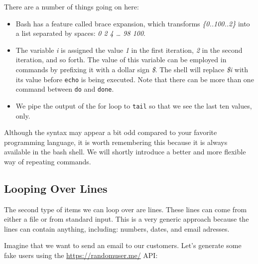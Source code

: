 \documentclass[
]{book}
\newenvironment{Shaded}{\begin{snugshade}}{\end{snugshade}}
\newcommand{\ExtensionTok}[1]{#1}
\newcommand{\FunctionTok}[1]{\textcolor[rgb]{0.00,0.00,0.00}{#1}}
\newcommand{\NormalTok}[1]{#1}
\newcommand{\OperatorTok}[1]{\textcolor[rgb]{0.81,0.36,0.00}{\textbf{#1}}}
\newcommand{\StringTok}[1]{\textcolor[rgb]{0.31,0.60,0.02}{#1}}
\providecommand{\tightlist}{%
  \setlength{\itemsep}{0pt}\setlength{\parskip}{0pt}}
\theoremstyle{definition}
\theoremstyle{definition}
\theoremstyle{definition}
\theoremstyle{remark}
\begin{document}
There are a number of things going on here:

\begin{itemize}
\tightlist
\item
  Bash has a feature called brace expansion, which transforms \emph{\{0..100..2\}} into a list separated by spaces: \emph{0 2 4 \ldots{} 98 100}.
\item
  The variable \emph{i} is assigned the value \emph{1} in the first iteration, \emph{2} in the second iteration, and so forth. The value of this variable can be employed in commands by prefixing it with a dollar sign \emph{\$}. The shell will replace \emph{\$i} with its value before \texttt{echo} is being executed. Note that there can be more than one command between \texttt{do} and \texttt{done}.
\item
  We pipe the output of the for loop to \texttt{tail} so that we see the last ten values, only.
\end{itemize}

Although the syntax may appear a bit odd compared to your favorite programming language, it is worth remembering this because it is always available in the bash shell. We will shortly introduce a better and more flexible way of repeating commands.

\hypertarget{looping-over-lines}{%
\subsection{Looping Over Lines}\label{looping-over-lines}}

The second type of items we can loop over are lines. These lines can come from either a file or from standard input. This is a very generic approach because the lines can contain anything, including: numbers, dates, and email adresses.

Imagine that we want to send an email to our customers. Let's generate some fake users using the \url{https://randomuser.me/} API:

\begin{Shaded}
\end{Shaded}
\end{document}

